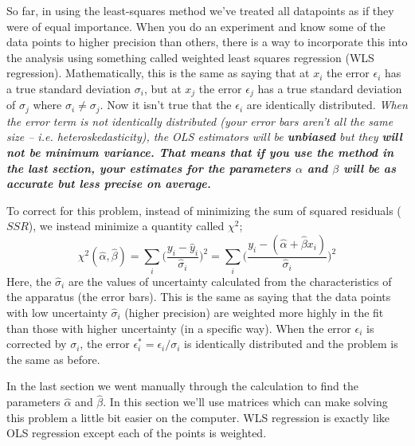 So far, in using the least-squares method we've treated all datapoints as if they were of equal importance. When you do an experiment and know some of the data points to higher precision than others, there is a way to incorporate this into the analysis using something called weighted least squares regression (WLS regression). Mathematically, this is the same as saying that at $x_i$ the error $\epsilon_i$  has a true standard deviation $\sigma_i$, but at $x_j$ the error $\epsilon_j$ has a true standard deviation of $\sigma_j$ where $\sigma_i \neq \sigma_j$. Now it isn't true that the $\epsilon_i$ are identically distributed. \emph{When the error term is not identically distributed (your error bars aren't all the same size -- i.e. heteroskedasticity), the OLS estimators will be {\bf unbiased} but they {\bf will not be minimum variance. That means that if you use the method in the last section, your estimates for the parameters $\alpha$ and $\beta$ will be as accurate but less precise on average.}}

To correct for this problem, instead of minimizing the sum of squared residuals ($SSR$), we instead minimize a quantity called $\chi^2$;
\begin{equation}
\chi^2(\hat \alpha, \hat \beta) = \sum_i \bigg (\frac{y_i - \hat y_i}{\hat \sigma_i} \bigg )^2= \sum_i \bigg (\frac{y_i - (\hat \alpha + \hat \beta x_i)}{\hat \sigma_i}\bigg )^2
\end{equation}
Here, the $\hat \sigma_i$ are the values of uncertainty calculated from the characteristics of the apparatus (the error bars). This is the same as saying that the data points with low uncertainty $\hat \sigma_i$  (higher precision) are weighted more highly in the fit than those with higher uncertainty (in a specific way). When the error $\epsilon_i$ is corrected by $\sigma_i$, the error $\epsilon_i^* = \epsilon_i/\sigma_i$ is identically distributed and the problem is the same as before. 
%

In the last section we went manually through the calculation to find the parameters $\hat \alpha$ and $\hat \beta$. In this section we'll use matrices which can make solving this problem a little bit easier on the computer. WLS regression is exactly like OLS regression except each of the points is weighted.
